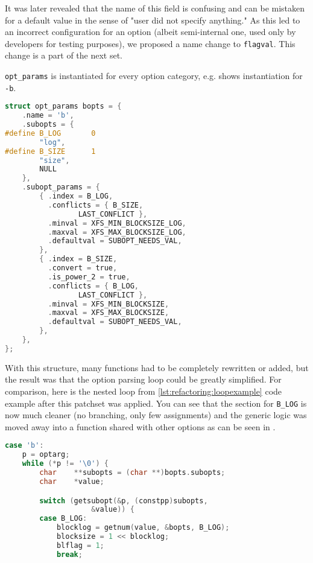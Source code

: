 \begin{description}
    It was later revealed that the name of this field is confusing and can
    be mistaken for a default value in the sense of "user did not specify
    anything." As this led to an incorrect configuration for an option
    (albeit semi-internal one, used only by developers for testing
    purposes), we proposed a name change to {\tt flagval}. This change is a
    part of the next set.
		
\end{description}

{\tt opt\_params} is instantiated for every option category, e.g.
 shows instantiation for {\tt
-b}.

\begin{lstlisting}[frame=none, basicstyle=\footnotesize\ttfamily,
language=C, numbers=none, numberstyle=\tiny\color{black},
caption= {Instantiation of the table for block options.},
label={lst:refactoring:instantiation}]
struct opt_params bopts = {
	.name = 'b',
	.subopts = {
#define	B_LOG		0
		"log",
#define	B_SIZE		1
		"size",
		NULL
	},
	.subopt_params = {
		{ .index = B_LOG,
		  .conflicts = { B_SIZE,
				 LAST_CONFLICT },
		  .minval = XFS_MIN_BLOCKSIZE_LOG,
		  .maxval = XFS_MAX_BLOCKSIZE_LOG,
		  .defaultval = SUBOPT_NEEDS_VAL,
		},
		{ .index = B_SIZE,
		  .convert = true,
		  .is_power_2 = true,
		  .conflicts = { B_LOG,
				 LAST_CONFLICT },
		  .minval = XFS_MIN_BLOCKSIZE,
		  .maxval = XFS_MAX_BLOCKSIZE,
		  .defaultval = SUBOPT_NEEDS_VAL,
		},
	},
};
\end{lstlisting}

With this structure, many functions had to be completely rewritten or
added, but the result was that the option parsing loop could be greatly
simplified. For comparison, here is the nested loop from
\ref{lst:refactoring:loopexample} code example after this patchset was
applied. You can see that the section for {\tt B\_LOG} is now much cleaner
(no branching, only few assignments) and the generic logic was moved away
into a function shared with other options as can be seen in
.

\begin{lstlisting}[frame=none, basicstyle=\footnotesize\ttfamily,
language=C, numbers=none, numberstyle=\tiny\color{black},
caption= {Part of option-parsing loop from mkfs.xfs after the first patch
set.},
label={lst:refactoring:parsingAfterFirst}]
case 'b':
	p = optarg;
	while (*p != '\0') {
		char	**subopts = (char **)bopts.subopts;
		char	*value;

		switch (getsubopt(&p, (constpp)subopts,
					&value)) {
		case B_LOG:
			blocklog = getnum(value, &bopts, B_LOG);
			blocksize = 1 << blocklog;
			blflag = 1;
			break;
\end{lstlisting}

